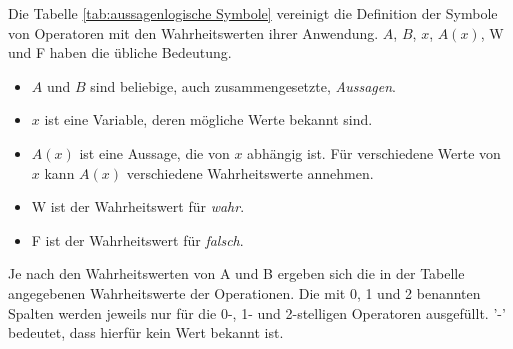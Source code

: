 \documentclass[english,ngerman,parskip=half,headsepline,footsepline]{scrreprt}
\begin{document}
	Die Tabelle \vref{tab:aussagenlogische Symbole} vereinigt die Definition der Symbole von Operatoren mit den Wahrheitswerten ihrer Anwendung. $A$, $B$, $x$, $A(x)$, W und F haben die übliche Bedeutung.
	
	\begin{itemize}
		\item $A$ und $B$ sind beliebige, auch zusammengesetzte, \emph{Aussagen}.
		\item $x$ ist eine Variable, deren mögliche Werte bekannt sind.
		\item $A(x)$ ist eine Aussage, die von $x$ abhängig ist. Für verschiedene Werte von $x$ kann $A(x)$ verschiedene Wahrheitswerte annehmen.
		\item W ist der Wahrheitswert für \emph{wahr}.
		\item F ist der Wahrheitswert für \emph{falsch}.
	\end{itemize}
	
	Je nach den Wahrheitswerten von A und B ergeben sich die in der Tabelle angegebenen Wahrheitswerte der Operationen. Die mit 0, 1 und 2 benannten Spalten werden jeweils nur für die 0-, 1- und 2-stelligen Operatoren ausgefüllt. '-' bedeutet, dass hierfür kein Wert bekannt ist.
	
\end{document}
